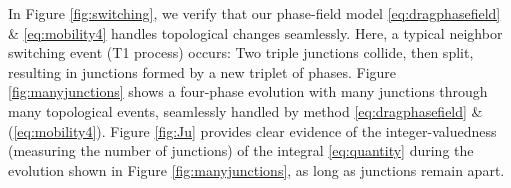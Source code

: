 \documentclass{article}
\theoremstyle{plain}
\theoremstyle{definition}
\theoremstyle{remark}
\newcommand{\eps}{\varepsilon}
\begin{document}












\clearpage







In Figure \ref{fig:switching}, we verify that our phase-field model \eqref{eq:dragphasefield} \& \eqref{eq:mobility4} handles topological changes seamlessly. Here, a typical neighbor switching event (T1 process) occurs:
Two triple junctions collide, then split, resulting in junctions formed by a new triplet of phases.
Figure \ref{fig:manyjunctions} shows a four-phase evolution with many junctions through many topological events, seamlessly handled by method \eqref{eq:dragphasefield} \& (\ref{eq:mobility4}).
Figure \ref{fig:Ju} provides clear evidence of the integer-valuedness (measuring the number of junctions) of the integral \eqref{eq:quantity} during the evolution shown in Figure \ref{fig:manyjunctions}, as long as junctions remain apart.
\end{document}

